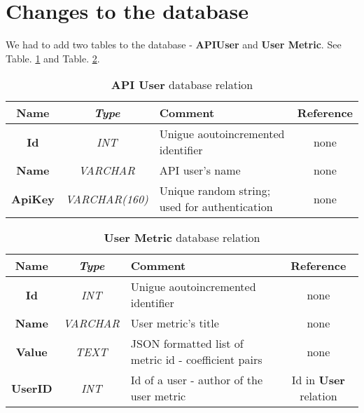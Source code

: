 \section{Changes to the database}

	We had to add two tables to the database - \textbf{APIUser} and \textbf{User Metric}. See Table. \ref{apiusertable} and Table. \ref{umetrictable}.
	
	\begin{table}[t!]
		\centering
		\begin{tabular}{| >{\bf}c | >{\em}c | l | c |} 
			\hline
			Name	& Type			& Comment										& Reference	\\ \hline
			Id		& INT			& Unigue aoutoincremented identifier			& none		\\
			Name	& VARCHAR		& API user's name								& none		\\
			ApiKey	& VARCHAR(160)	& Unique random string; used for authentication	& none		\\
			\hline
		\end{tabular}
		\caption{\textbf{API User} database relation}
		\label{apiusertable}
	\end{table}
	
	\begin{table}[t!]
		\centering
		\begin{tabular}{| >{\bf}c | >{\em}c | l | c |} 
			\hline
			Name	& Type			& Comment												& Reference						\\ \hline
			Id		& INT			& Unigue aoutoincremented identifier					& none							\\
			Name	& VARCHAR		& User metric's title									& none							\\
			Value	& TEXT			& JSON formatted list of metric id - coefficient pairs	& none							\\
			UserID	& INT			& Id of a user - author of the user metric				& Id in \textbf{User} relation	\\
			\hline
		\end{tabular}
		\caption{\textbf{User Metric} database relation}
		\label{umetrictable}
	\end{table}